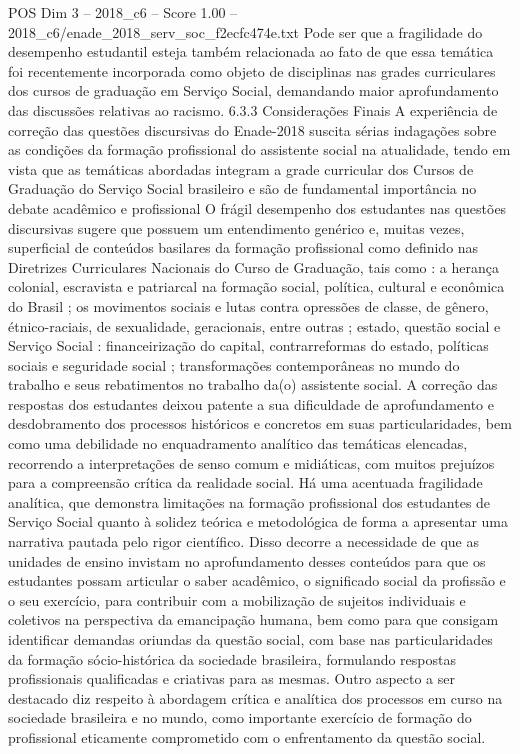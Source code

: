 \begin{textsample}{POS Dim 3 – 2018\_c6 – Score 1.00 – 2018\_c6/enade\_2018\_serv\_soc\_f2ecfc474e.txt}
Pode ser que a fragilidade do desempenho estudantil esteja também relacionada ao fato de que essa temática foi recentemente incorporada como objeto de disciplinas nas grades curriculares dos cursos de graduação em Serviço Social, demandando maior aprofundamento das discussões relativas ao racismo. 6.3.3 Considerações Finais A experiência de correção das questões discursivas do Enade-2018 suscita sérias indagações sobre as condições da formação profissional do assistente social na atualidade, tendo em vista que as temáticas abordadas integram a grade curricular dos Cursos de Graduação do Serviço Social brasileiro e são de fundamental importância no debate acadêmico e profissional O frágil desempenho dos estudantes nas questões discursivas sugere que possuem um entendimento genérico e, muitas vezes, superficial de conteúdos basilares da formação profissional como definido nas Diretrizes Curriculares Nacionais do Curso de Graduação, tais como : a herança colonial, escravista e patriarcal na formação social, política, cultural e econômica do Brasil ; os movimentos sociais e lutas contra opressões de classe, de gênero, étnico-raciais, de sexualidade, geracionais, entre outras ; estado, questão social e Serviço Social : financeirização do capital, contrarreformas do estado, políticas sociais e seguridade social ; transformações contemporâneas no mundo do trabalho e seus rebatimentos no trabalho da(o) assistente social.
A correção das respostas dos estudantes deixou patente a sua dificuldade de aprofundamento e desdobramento dos processos históricos e concretos em suas particularidades, bem como uma debilidade no enquadramento analítico das temáticas elencadas, recorrendo a interpretações de senso comum e midiáticas, com muitos prejuízos para a compreensão crítica da realidade social.
Há uma acentuada fragilidade analítica, que demonstra limitações na formação profissional dos estudantes de Serviço Social quanto à solidez teórica e metodológica de forma a apresentar uma narrativa pautada pelo rigor científico.
Disso decorre a necessidade de que as unidades de ensino invistam no aprofundamento desses conteúdos para que os estudantes possam articular o saber acadêmico, o significado social da profissão e o seu exercício, para contribuir com a mobilização de sujeitos individuais e coletivos na perspectiva da emancipação humana, bem como para que consigam identificar demandas oriundas da questão social, com base nas particularidades da formação sócio-histórica da sociedade brasileira, formulando respostas profissionais qualificadas e criativas para as mesmas.
Outro aspecto a ser destacado diz respeito à abordagem crítica e analítica dos processos em curso na sociedade brasileira e no mundo, como importante exercício de formação do profissional eticamente comprometido com o enfrentamento da questão social.

\end{textsample}
